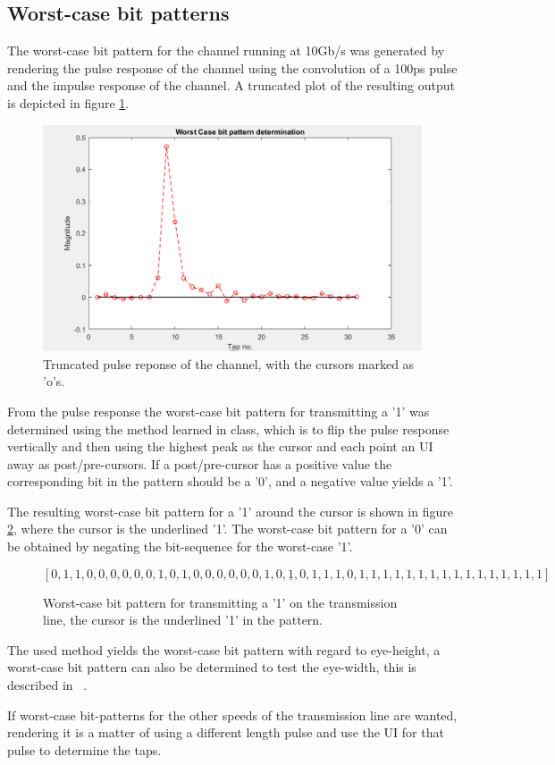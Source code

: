 
\subsection{Worst-case bit patterns}

The worst-case bit pattern for the channel running at 10Gb/s was generated by rendering the pulse response of the channel using the convolution of a 100ps pulse and the impulse response of the channel. A truncated plot of the resulting output is depicted in figure \ref{fig:worst}.


\begin{figure}[ht!]
\begin{center}
\includegraphics[scale=0.8]{img/graph}
\caption{Truncated pulse reponse of the channel, with the cursors marked as 'o's.}
\label{fig:worst}
\end{center}
\end{figure}

From the pulse response the worst-case bit pattern for transmitting a 
'1' was determined using the method learned in class, which is to flip the pulse response vertically and then using the highest peak as the cursor and each point an UI away as post/pre-cursors. If a post/pre-cursor has a positive value the corresponding bit in the pattern should be a '0', and a negative value yields a '1'.

The resulting worst-case bit pattern for a '1' around the cursor is shown in figure \ref{eq:wc}, where the cursor is the underlined '1'. The worst-case bit pattern for a '0' can be obtained by negating the bit-sequence for the worst-case '1'.


\begin{figure}[H]
$$\left[0,1,1,0,0,0,0,0,0,1,0,1,0,0,0,0,0,0,1,0,\underline{1},0,1,1,1,0,1,1,1,1,1,1,1,1,1,1,1,1,1,1,1,1\right]$$
\caption{Worst-case bit pattern for transmitting a '1' on the transmission line, the cursor is the underlined '1' in the pattern.}
\label{eq:wc}

\end{figure}



The used method yields the worst-case bit pattern with regard to eye-height, a worst-case bit pattern can also be determined to test the eye-width, this is described in ~\cite{designcon2011a}.

If worst-case bit-patterns for the other speeds of the transmission line are wanted, rendering it is a matter of using a different length pulse and use the UI for that pulse to determine the taps.